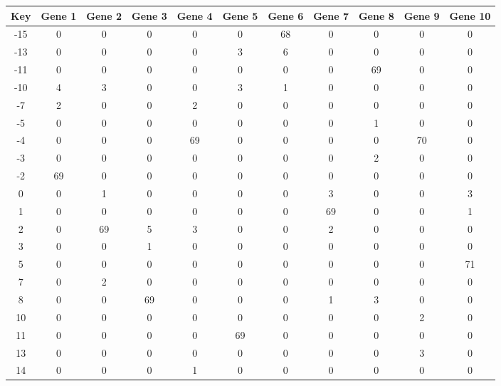 \begin{tabular}{|c|c|c|c|c|c|c|c|c|c|c|}
\hline
Key & Gene 1 & Gene 2 & Gene 3 & Gene 4 & Gene 5 & Gene 6 & Gene 7 & Gene 8 & Gene 9 & Gene 10 \\
\hline
-15 & 0 & 0 & 0 & 0 & 0 & 68 & 0 & 0 & 0 & 0 \\
-13 & 0 & 0 & 0 & 0 & 3 & 6 & 0 & 0 & 0 & 0 \\
-11 & 0 & 0 & 0 & 0 & 0 & 0 & 0 & 69 & 0 & 0 \\
-10 & 4 & 3 & 0 & 0 & 3 & 1 & 0 & 0 & 0 & 0 \\
-7 & 2 & 0 & 0 & 2 & 0 & 0 & 0 & 0 & 0 & 0 \\
-5 & 0 & 0 & 0 & 0 & 0 & 0 & 0 & 1 & 0 & 0 \\
-4 & 0 & 0 & 0 & 69 & 0 & 0 & 0 & 0 & 70 & 0 \\
-3 & 0 & 0 & 0 & 0 & 0 & 0 & 0 & 2 & 0 & 0 \\
-2 & 69 & 0 & 0 & 0 & 0 & 0 & 0 & 0 & 0 & 0 \\
0 & 0 & 1 & 0 & 0 & 0 & 0 & 3 & 0 & 0 & 3 \\
1 & 0 & 0 & 0 & 0 & 0 & 0 & 69 & 0 & 0 & 1 \\
2 & 0 & 69 & 5 & 3 & 0 & 0 & 2 & 0 & 0 & 0 \\
3 & 0 & 0 & 1 & 0 & 0 & 0 & 0 & 0 & 0 & 0 \\
5 & 0 & 0 & 0 & 0 & 0 & 0 & 0 & 0 & 0 & 71 \\
7 & 0 & 2 & 0 & 0 & 0 & 0 & 0 & 0 & 0 & 0 \\
8 & 0 & 0 & 69 & 0 & 0 & 0 & 1 & 3 & 0 & 0 \\
10 & 0 & 0 & 0 & 0 & 0 & 0 & 0 & 0 & 2 & 0 \\
11 & 0 & 0 & 0 & 0 & 69 & 0 & 0 & 0 & 0 & 0 \\
13 & 0 & 0 & 0 & 0 & 0 & 0 & 0 & 0 & 3 & 0 \\
14 & 0 & 0 & 0 & 1 & 0 & 0 & 0 & 0 & 0 & 0 \\
\hline
\end{tabular}